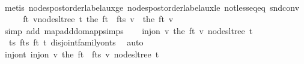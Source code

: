 \begin{isabellebody}
\ \ \ \ \isamarkupfalse%
\ {\isacharparenleft}{\kern0pt}metis\ nodes{\isacharunderscore}{\kern0pt}postorder{\isacharunderscore}{\kern0pt}label{\isacharunderscore}{\kern0pt}aux{\isacharunderscore}{\kern0pt}ge\ nodes{\isacharunderscore}{\kern0pt}postorder{\isacharunderscore}{\kern0pt}label{\isacharunderscore}{\kern0pt}aux{\isacharunderscore}{\kern0pt}le\ not{\isacharunderscore}{\kern0pt}less{\isacharunderscore}{\kern0pt}eq{\isacharunderscore}{\kern0pt}eq\ snd{\isacharunderscore}{\kern0pt}conv{\isacharparenright}{\kern0pt}\isanewline
\ \ \isamarkupfalse%
\ \isamarkupfalse%
\ f{\isacharunderscore}{\kern0pt}t{\isacharprime}{\kern0pt}{\isacharcolon}{\kern0pt}\ {\isachardoublequoteopen}{\isasymforall}v{\isasymin}nodes{\isacharunderscore}{\kern0pt}ltree\ t{\isacharprime}{\kern0pt}{\isachardot}{\kern0pt}\ the\ {\isacharparenleft}{\kern0pt}{\isacharparenleft}{\kern0pt}f{\isacharunderscore}{\kern0pt}t\ {\isacharplus}{\kern0pt}{\isacharplus}{\kern0pt}\ f{\isacharunderscore}{\kern0pt}ts{\isacharparenright}{\kern0pt}\ v{\isacharparenright}{\kern0pt}\ {\isacharequal}{\kern0pt}\ the\ {\isacharparenleft}{\kern0pt}f{\isacharunderscore}{\kern0pt}t\ v{\isacharparenright}{\kern0pt}{\isachardoublequoteclose}\isanewline
\ \ \ \ \isamarkupfalse%
\ {\isacharparenleft}{\kern0pt}simp\ add{\isacharcolon}{\kern0pt}\ map{\isacharunderscore}{\kern0pt}add{\isacharunderscore}{\kern0pt}dom{\isacharunderscore}{\kern0pt}app{\isacharunderscore}{\kern0pt}simps{\isacharparenleft}{\kern0pt}{}{\isacharparenright}{\kern0pt}{\isacharparenright}{\kern0pt}\isanewline
\ \ \isamarkupfalse%
\ {\isachardoublequoteopen}inj{\isacharunderscore}{\kern0pt}on\ {\isacharparenleft}{\kern0pt}{\isasymlambda}v{\isachardot}{\kern0pt}\ the\ {\isacharparenleft}{\kern0pt}f{\isacharunderscore}{\kern0pt}t\ v{\isacharparenright}{\kern0pt}{\isacharparenright}{\kern0pt}\ {\isacharparenleft}{\kern0pt}nodes{\isacharunderscore}{\kern0pt}ltree\ t{\isacharprime}{\kern0pt}{\isacharparenright}{\kern0pt}{\isachardoublequoteclose}\ \isamarkupfalse%
\ {}\ ts{\isacharprime}{\kern0pt}\ f{\isacharunderscore}{\kern0pt}ts\ f{\isacharunderscore}{\kern0pt}t\ t{\isacharprime}{\kern0pt}\ disjoint{\isacharunderscore}{\kern0pt}family{\isacharunderscore}{\kern0pt}on{\isacharunderscore}{\kern0pt}ts\ \isamarkupfalse%
\ auto\isanewline
\ \ \isamarkupfalse%
\ \isamarkupfalse%
\ inj{\isacharunderscore}{\kern0pt}on{\isacharunderscore}{\kern0pt}t{\isacharprime}{\kern0pt}{\isacharcolon}{\kern0pt}\ {\isachardoublequoteopen}inj{\isacharunderscore}{\kern0pt}on\ {\isacharparenleft}{\kern0pt}{\isasymlambda}v{\isachardot}{\kern0pt}\ the\ {\isacharparenleft}{\kern0pt}{\isacharparenleft}{\kern0pt}f{\isacharunderscore}{\kern0pt}t\ {\isacharplus}{\kern0pt}{\isacharplus}{\kern0pt}\ f{\isacharunderscore}{\kern0pt}ts{\isacharparenright}{\kern0pt}\ v{\isacharparenright}{\kern0pt}{\isacharparenright}{\kern0pt}\ {\isacharparenleft}{\kern0pt}nodes{\isacharunderscore}{\kern0pt}ltree\ t{\isacharprime}{\kern0pt}{\isacharparenright}{\kern0pt}{\isachardoublequoteclose}\isanewline

\end{isabellebody}
